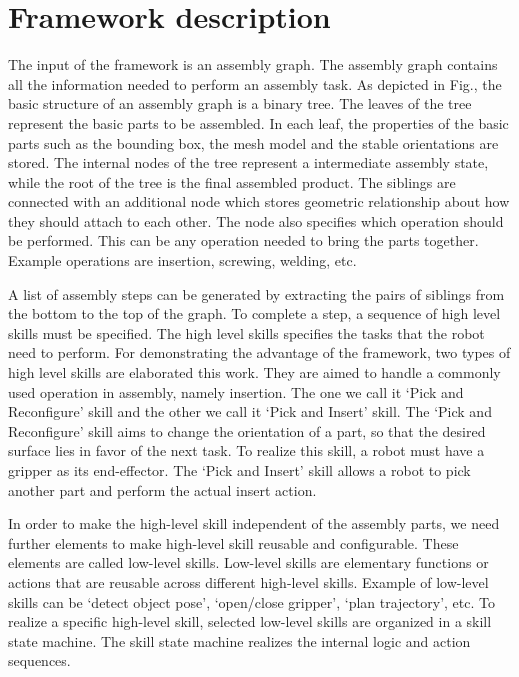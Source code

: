 \section{Framework description}
The input of the framework is an assembly graph. The assembly graph contains all the information needed to perform an assembly task. As depicted in Fig.,  the basic structure of an assembly graph is a binary tree. The leaves of the tree represent the basic parts to be assembled. In each leaf, the properties of the basic parts such as the bounding box, the mesh model and the stable orientations are stored. The internal nodes of the tree represent a intermediate assembly state, while the root of the tree is the final assembled product. The siblings are connected with an additional node which stores geometric relationship about how they should attach to each other. The node also specifies which operation should be performed. This can be any operation needed to bring the parts together. Example operations are insertion, screwing, welding, etc. 

A list of assembly steps can be generated by extracting the pairs of siblings from the bottom to the top of the graph. To complete a step, a sequence of high level skills must be specified. The high level skills specifies the tasks that the robot need to perform. For demonstrating the advantage of the framework,  two types of high level skills are elaborated this work. They are aimed to handle a commonly used operation in assembly, namely insertion.  The one we call it `Pick and Reconfigure' skill and the other we call it `Pick and Insert' skill. The `Pick and Reconfigure' skill aims to change the orientation of a part, so that the desired surface lies in favor of the next task. To realize this skill, a robot must have a gripper as its end-effector. The `Pick and Insert' skill allows a robot to pick another part and perform the actual insert action. 

In order to make the high-level skill independent of the assembly parts, we need further elements to make high-level skill reusable and configurable. These elements are called low-level skills. Low-level skills are elementary functions or actions that are reusable across different high-level skills.  Example of low-level skills can be `detect object pose', `open/close gripper', `plan trajectory', etc. To realize a specific high-level skill, selected low-level skills are organized in a skill state machine. The skill state machine realizes the internal logic and action sequences. 


